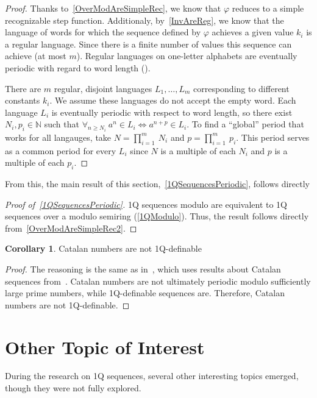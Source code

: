 \documentclass[12pt]{article}
\theoremstyle{definition}
\newtheorem{corollary}{Corollary}[section]
\begin{document}
\begin{proof}
    Thanks to~\cref{OverModAreSimpleRec}, we know that $\varphi$ reduces to a simple recognizable step function. Additionaly, by~\cref{InvAreReg}, we know that the language of words for which the sequence defined by $\varphi$ achieves a given value $k_i$ is a regular language. Since there is a finite number of values this sequence can achieve (at most $m$). Regular languages on one-letter alphabets are eventually periodic with regard to word length (\cite[Theorem 1]{PighizziniS02}).

    There are $m$ regular, disjoint languages $L_1, \ldots, L_m$ corresponding to different constants $k_i$. We assume these languages do not accept the empty word. Each language $L_i$ is eventually periodic with respect to word length, so there exist $N_i, p_i \in \mathbb{N}$ such that $\forall_{n \geq N_i} \ a^n \in L_i \iff a^{n + p} \in L_i$. To find a ``global'' period that works for all langauges, take $N = \prod_{i=1}^m \ N_i$ and $p = \prod_{i=1}^m \ p_i$. This period serves as a common period for every $L_i$ since $N$ is a multiple of each $N_i$ and $p$ is a multiple of each $p_i$.
\end{proof}

From this, the main result of this section,~\cref{1QSequencesPeriodic}, follows directly

\begin{proof}[Proof of~\cref{1QSequencesPeriodic}]
    1Q sequences modulo are equivalent to 1Q sequences over a modulo semiring (\cref{1QModulo}). Thus, the result follows directly from~\cref{OverModAreSimpleRec2}.
\end{proof}

\begin{corollary}
    Catalan numbers are not 1Q-definable
\end{corollary}

\begin{proof}
    The reasoning is the same as in~\cite[Theorem 7, Corollary 8]{CadilhacMPPS20}, which uses results about Catalan sequences from~\cite{KubotaCatalan}. Catalan numbers are not ultimately periodic modulo sufficiently large prime numbers, while 1Q-definable sequences are. Therefore, Catalan numbers are not 1Q-definable.
\end{proof}

\section{Other Topic of Interest}
\label{SecOther}
During the research on 1Q sequences, several other interesting topics emerged, though they were not fully explored.
\end{document}
